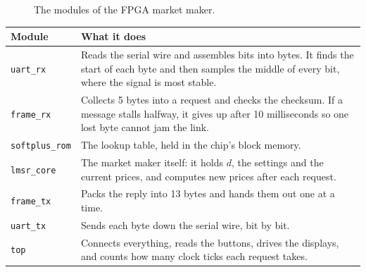 \documentclass[11pt]{article}
\newcommand{\code}[1]{\texttt{#1}}
\begin{document}
\begin{figure}[h]
\centering
{}
\caption{The modules of the FPGA market maker.}
\end{figure}

\begin{table}[h]
\centering
\renewcommand{\arraystretch}{1.2}
\begin{tabularx}{\textwidth}{>{\raggedright\arraybackslash}p{}X}
\toprule
\textbf{Module} & \textbf{What it does} \\
\midrule
\code{uart\_rx} & Reads the serial wire and assembles bits into bytes. It
finds the start of each byte and then samples the middle of every bit, where
the signal is most stable. \\
\code{frame\_rx} & Collects 5 bytes into a request and checks the checksum. If
a message stalls halfway, it gives up after 10 milliseconds so one lost byte
cannot jam the link. \\
\code{softplus\_rom} & The lookup table, held in the chip's block memory. \\
\code{lmsr\_core} & The market maker itself: it holds $d$, the settings and the
current prices, and computes new prices after each request. \\
\code{frame\_tx} & Packs the reply into 13 bytes and hands them out one at a time. \\
\code{uart\_tx} & Sends each byte down the serial wire, bit by bit. \\
\code{top} & Connects everything, reads the buttons, drives the displays, and
counts how many clock ticks each request takes. \\
\bottomrule
\end{tabularx}
\end{table}
\end{document}
